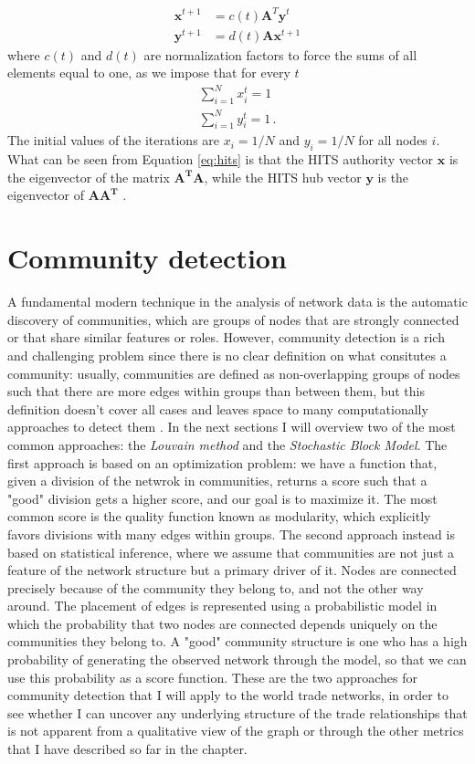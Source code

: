 \begin{align}\label{eq:hits}
    \mathbf{x}^{t+1} &= c(t) \mathbf{A}^T \mathbf{y}^t \\
    \mathbf{y}^{t+1} &= d(t) \mathbf{A} \mathbf{x}^{t+1} 
\end{align}
where $c(t)$ and $d(t)$ are normalization factors to force the sums of all elements equal to one, as we impose that for every $t$
\begin{align*}
    \sum_{i=1}^N x_i^{t} = 1 \\
    \sum_{i=1}^N y_i^{t} = 1 \,.
\end{align*}
The initial values of the iterations are $x_i = 1/N$ and $y_i = 1/N$ for all nodes $i$. What can be seen from Equation \ref{eq:hits} is that the HITS authority vector $\mathbf{x}$ is the eigenvector of the matrix $\mathbf{A^T A}$, while the HITS hub vector $\mathbf{y}$ is the eigenvector of $\mathbf{A A^T}$ \cite{deguchi2014hubs}.

\section{Community detection}
A fundamental modern technique in the analysis of network data is the automatic discovery of communities, which are groups of nodes that are strongly connected or that share similar features or roles. However, community detection is a rich and challenging problem since there is no clear definition on what consitutes a community: usually, communities are defined as non-overlapping groups of nodes such that there are more edges within groups than between them, but this definition doesn't cover all cases and leaves space to many computationally approaches to detect them \cite{fortunato202220years}. In the next sections I will overview two of the most common approaches: the \textit{Louvain method} and the \textit{Stochastic Block Model}. 
The first approach is based on an optimization problem: we have a function that, given a division of the netwrok in communities, returns a score such that a "good" division gets a higher score, and our goal is to maximize it. The most common score is the quality function known as modularity, which explicitly favors divisions with many edges within groups.
The second approach instead is based on statistical inference, where we assume that communities are not just a feature of the network structure but a primary driver of it. Nodes are connected precisely because of the community they belong to, and not the other way around. The placement of edges is represented using a probabilistic model in which the probability that two nodes are connected depends uniquely on the communities they belong to. A "good" community structure is one who has a high probability of generating the observed network through the model, so that we can use this probability as a score function.
These are the two approaches for community detection that I will apply to the world trade networks, in order to see whether I can uncover any underlying structure of the trade relationships that is not apparent from a qualitative view of the graph or through the other metrics that I have described so far in the chapter.


